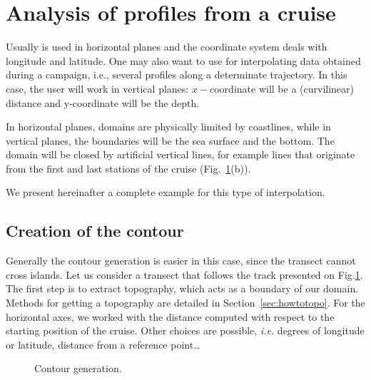 




\section{Analysis of profiles from a cruise\label{sec:cruise}}

Usually \diva is used in horizontal planes and the coordinate system deals with longitude and latitude. One may also want to use \diva for interpolating data obtained during a campaign, i.e., several profiles along a determinate trajectory. In this case, the user will work in vertical planes: $x-$coordinate will be a (curvilinear) distance and y-coordinate will be the depth.

In horizontal planes, domains are physically limited by coastlines, while in vertical planes, the boundaries will be the sea surface and the bottom. The domain will be closed by artificial vertical lines, for example lines that originate from the first and last stations of the cruise (Fig.~\ref{fig:data}(b)).

We present hereinafter a complete example for this type of interpolation.


\subsection{Creation of the contour}

Generally the contour generation is easier in this case, since the transect cannot cross islands. Let us consider a transect that follows the track presented on Fig.\ref{fig:data}. The first step is to extract topography, which acts as a boundary of our domain. Methods for getting a topography are detailed in Section~\ref{sec:howtotopo}. For the horizontal axes, we worked with the distance computed with respect to the starting position of the cruise. Other choices are possible, \textit{i.e.} degrees of longitude or latitude, distance from a reference point\ldots

\begin{figure}[htpb]
\centering
{}
\caption{Contour generation.\label{fig:data}}
\end{figure}


